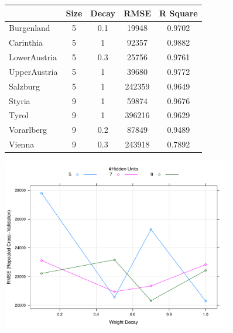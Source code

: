 \documentclass[a4paper,reqno,]{article}
\begin{document}
\begin{enumerate}
\begin{figure}[H]
	\begin{minipage}[b]{0.5\textwidth}
      \centering
    \begin{tabular}{lcccc}
    \toprule
    & \multicolumn{1}{l}{\textbf{Size}} & \multicolumn{1}{l}{\textbf{Decay}} & \multicolumn{1}{l}{\textbf{RMSE}} & \multicolumn{1}{l}{\textbf{R Square}} \\
    \midrule
    Burgenland & 5     & 0.1   & 19948 & 0.9702 \\
    Carinthia & 5     & 1     & 92357 & 0.9882 \\
    LowerAustria & 5     & 0.3   & 25756 & 0.9761 \\
    UpperAustria & 5     & 1     & 39680 & 0.9772 \\
    Salzburg & 5     & 1     & 242359 & 0.9649 \\
    Styria & 9     & 1     & 59874 & 0.9676 \\
    Tyrol & 9     & 1     & 396216 & 0.9629 \\
    Vorarlberg & 9     & 0.2   & 87849 & 0.9489 \\
    Vienna & 9     & 0.3   & 243918 & 0.7892 \\
    \bottomrule
    \end{tabular}
   \label{tab:nnet_besttune}
\end{minipage}
\begin{minipage}[b]{0.5\textwidth}
\centering
    \includegraphics[clip,trim=0cm 0.3cm 0cm 0cm,width=0.9\textwidth]{images/ANN/nnet_grid_search.pdf}
       \label{fig:nn_besttune}
\end{minipage}
\end{figure}


\end{enumerate}
\end{document}
